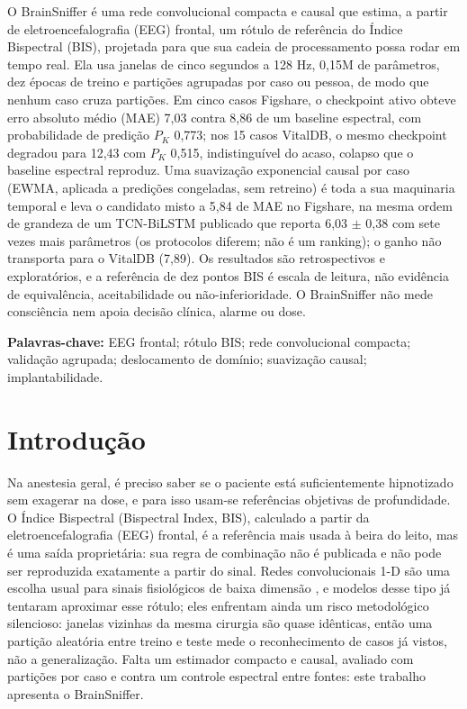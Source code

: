 \documentclass[12pt]{article}
\begin{document}
\begin{resumo}
O BrainSniffer é uma rede convolucional compacta e causal que estima, a partir de eletroencefalografia (EEG) frontal, um rótulo de referência do Índice Bispectral (BIS), projetada para que sua cadeia de processamento possa rodar em tempo real. Ela usa janelas de cinco segundos a 128 Hz, 0,15M de parâmetros, dez épocas de treino e partições agrupadas por caso ou pessoa, de modo que nenhum caso cruza partições. Em cinco casos Figshare, o checkpoint ativo obteve erro absoluto médio (MAE) 7,03 contra 8,86 de um baseline espectral, com probabilidade de predição $P_K$ 0,773; nos 15 casos VitalDB, o mesmo checkpoint degradou para 12,43 com $P_K$ 0,515, indistinguível do acaso, colapso que o baseline espectral reproduz. Uma suavização exponencial causal por caso (EWMA, aplicada a predições congeladas, sem retreino) é toda a sua maquinaria temporal e leva o candidato misto a 5,84 de MAE no Figshare, na mesma ordem de grandeza de um TCN-BiLSTM publicado que reporta 6,03 $\pm$ 0,38 com sete vezes mais parâmetros (os protocolos diferem; não é um ranking); o ganho não transporta para o VitalDB (7,89). Os resultados são retrospectivos e exploratórios, e a referência de dez pontos BIS é escala de leitura, não evidência de equivalência, aceitabilidade ou não-inferioridade. O BrainSniffer não mede consciência nem apoia decisão clínica, alarme ou dose.

\textbf{Palavras-chave:} EEG frontal; rótulo BIS; rede convolucional compacta; validação agrupada; deslocamento de domínio; suavização causal; implantabilidade.
\end{resumo}

\section{Introdução}

Na anestesia geral, é preciso saber se o paciente está suficientemente hipnotizado sem exagerar na dose, e para isso usam-se referências objetivas de profundidade. O Índice Bispectral (Bispectral Index, BIS), calculado a partir da eletroencefalografia (EEG) frontal, é a referência mais usada à beira do leito, mas é uma saída proprietária: sua regra de combinação não é publicada e não pode ser reproduzida exatamente a partir do sinal. Redes convolucionais 1-D são uma escolha usual para sinais fisiológicos de baixa dimensão \cite{kiranyaz2021,craik2019}, e modelos desse tipo já tentaram aproximar esse rótulo; eles enfrentam ainda um risco metodológico silencioso: janelas vizinhas da mesma cirurgia são quase idênticas, então uma partição aleatória entre treino e teste mede o reconhecimento de casos já vistos, não a generalização. Falta um estimador compacto e causal, avaliado com partições por caso e contra um controle espectral entre fontes: este trabalho apresenta o BrainSniffer.
\end{document}
